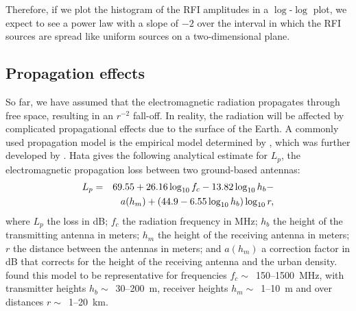 \documentclass[useAMS,usenatbib]{mn2e}
\begin{document}
Therefore, if we plot the histogram of the RFI amplitudes in a $\log$-$\log$ plot, we expect to see a power law with a slope of $-2$ over the interval in which the RFI sources are spread like uniform sources on a two-dimensional plane.

\subsection{Propagation effects}
So far, we have assumed that the electromagnetic radiation propagates through free space, resulting in an $r^{-2}$ fall-off. In reality, the radiation will be affected by complicated propagational effects due to the surface of the Earth. A commonly used propagation model is the empirical model determined by \citet{okumura-propagation-model}, which was further developed by \citet{hata-propagation-loss}. Hata gives the following analytical estimate for $L_p$, the electromagnetic propagation loss between two ground-based antennas:
\begin{align} 
\notag                L_p & = & 69.55 + 26.16 \log_{10} f_c - 13.82 \log_{10} h_b - \\
\label{eq:hata-model} & &  a(h_m) + (44.9 - 6.55 \log_{10} h_b) \log_{10} r, 
\end{align}
where $L_p$ the loss in dB; $f_c$ the radiation frequency in MHz; $h_b$ the height of the transmitting antenna in meters; $h_m$ the height of the receiving antenna in meters; $r$ the distance between the antennas in meters; and $a(h_m)$ a correction factor in dB that corrects for the height of the receiving antenna and the urban density. \citeauthor{hata-propagation-loss} found this model to be representative for frequencies $f_c \sim$~150--1500~MHz, with transmitter heights $h_b \sim$~30--200~m, receiver heights $h_m \sim$~1--10~m and over distances $r\sim$~1--20~km.
\end{document}

